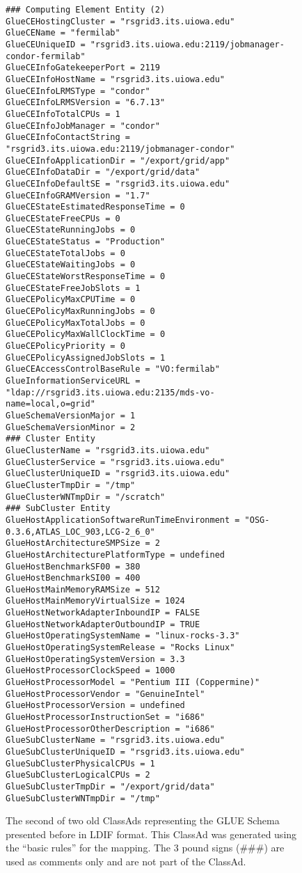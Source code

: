 \documentclass[12pt]{article}
\begin{document}
\begin{figure}
\scriptsize
\begin{verbatim}
### Computing Element Entity (2)
GlueCEHostingCluster = "rsgrid3.its.uiowa.edu"
GlueCEName = "fermilab"
GlueCEUniqueID = "rsgrid3.its.uiowa.edu:2119/jobmanager-condor-fermilab"
GlueCEInfoGatekeeperPort = 2119
GlueCEInfoHostName = "rsgrid3.its.uiowa.edu"
GlueCEInfoLRMSType = "condor"
GlueCEInfoLRMSVersion = "6.7.13"
GlueCEInfoTotalCPUs = 1
GlueCEInfoJobManager = "condor"
GlueCEInfoContactString = "rsgrid3.its.uiowa.edu:2119/jobmanager-condor"
GlueCEInfoApplicationDir = "/export/grid/app"
GlueCEInfoDataDir = "/export/grid/data"
GlueCEInfoDefaultSE = "rsgrid3.its.uiowa.edu"
GlueCEInfoGRAMVersion = "1.7"
GlueCEStateEstimatedResponseTime = 0
GlueCEStateFreeCPUs = 0
GlueCEStateRunningJobs = 0
GlueCEStateStatus = "Production"
GlueCEStateTotalJobs = 0
GlueCEStateWaitingJobs = 0
GlueCEStateWorstResponseTime = 0
GlueCEStateFreeJobSlots = 1
GlueCEPolicyMaxCPUTime = 0
GlueCEPolicyMaxRunningJobs = 0
GlueCEPolicyMaxTotalJobs = 0
GlueCEPolicyMaxWallClockTime = 0
GlueCEPolicyPriority = 0
GlueCEPolicyAssignedJobSlots = 1
GlueCEAccessControlBaseRule = "VO:fermilab"
GlueInformationServiceURL = "ldap://rsgrid3.its.uiowa.edu:2135/mds-vo-name=local,o=grid"
GlueSchemaVersionMajor = 1
GlueSchemaVersionMinor = 2
### Cluster Entity
GlueClusterName = "rsgrid3.its.uiowa.edu"
GlueClusterService = "rsgrid3.its.uiowa.edu"
GlueClusterUniqueID = "rsgrid3.its.uiowa.edu"
GlueClusterTmpDir = "/tmp"
GlueClusterWNTmpDir = "/scratch"
### SubCluster Entity
GlueHostApplicationSoftwareRunTimeEnvironment = "OSG-0.3.6,ATLAS_LOC_903,LCG-2_6_0"
GlueHostArchitectureSMPSize = 2
GlueHostArchitecturePlatformType = undefined
GlueHostBenchmarkSF00 = 380
GlueHostBenchmarkSI00 = 400
GlueHostMainMemoryRAMSize = 512
GlueHostMainMemoryVirtualSize = 1024
GlueHostNetworkAdapterInboundIP = FALSE
GlueHostNetworkAdapterOutboundIP = TRUE
GlueHostOperatingSystemName = "linux-rocks-3.3"
GlueHostOperatingSystemRelease = "Rocks Linux"
GlueHostOperatingSystemVersion = 3.3
GlueHostProcessorClockSpeed = 1000
GlueHostProcessorModel = "Pentium III (Coppermine)"
GlueHostProcessorVendor = "GenuineIntel"
GlueHostProcessorVersion = undefined
GlueHostProcessorInstructionSet = "i686"
GlueHostProcessorOtherDescription = "i686"
GlueSubClusterName = "rsgrid3.its.uiowa.edu"
GlueSubClusterUniqueID = "rsgrid3.its.uiowa.edu"
GlueSubClusterPhysicalCPUs = 1
GlueSubClusterLogicalCPUs = 2
GlueSubClusterTmpDir = "/export/grid/data"
GlueSubClusterWNTmpDir = "/tmp"
\end{verbatim}
\normalsize \caption[Example of an old ClassAd representation of the
GLUE Schema]{\label{CLASSAD-Basic-2-Example} The second of two old
ClassAds representing the GLUE Schema presented before in LDIF
format. This ClassAd was generated using the ``basic rules'' for the
mapping. The 3 pound signs (\#\#\#) are used as comments only and
are not part of the ClassAd.}
\end{figure}
\end{document}

